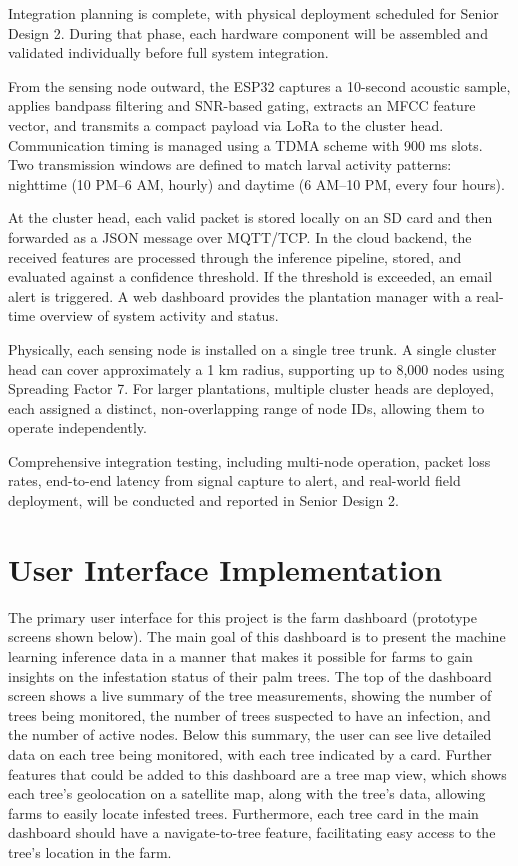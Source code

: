 \documentclass[12pt,a4paper,oneside]{memoir}
\begin{document}
Integration planning is complete, with physical deployment scheduled for Senior Design 2. During that phase, each hardware component will be assembled and validated individually before full system integration.

From the sensing node outward, the ESP32 captures a 10-second acoustic sample, applies bandpass filtering and SNR-based gating, extracts an MFCC feature vector, and transmits a compact payload via LoRa to the cluster head. Communication timing is managed using a TDMA scheme with 900 ms slots. Two transmission windows are defined to match larval activity patterns: nighttime (10 PM--6 AM, hourly) and daytime (6 AM--10 PM, every four hours).

At the cluster head, each valid packet is stored locally on an SD card and then forwarded as a JSON message over MQTT/TCP. In the cloud backend, the received features are processed through the inference pipeline, stored, and evaluated against a confidence threshold. If the threshold is exceeded, an email alert is triggered. A web dashboard provides the plantation manager with a real-time overview of system activity and status.

Physically, each sensing node is installed on a single tree trunk. A single cluster head can cover approximately a 1 km radius, supporting up to 8,000 nodes using Spreading Factor 7. For larger plantations, multiple cluster heads are deployed, each assigned a distinct, non-overlapping range of node IDs, allowing them to operate independently.

Comprehensive integration testing, including multi-node operation, packet loss rates, end-to-end latency from signal capture to alert, and real-world field deployment, will be conducted and reported in Senior Design 2.

\section{User Interface Implementation}
\label{sec:UIImplementation}

The primary user interface for this project is the farm dashboard (prototype screens shown below). The main goal of this dashboard is to present the machine learning inference data in a manner that makes it possible for farms to gain insights on the infestation status of their palm trees. The top of the dashboard screen shows a live summary of the tree measurements, showing the number of trees being monitored, the number of trees suspected to have an infection, and the number of active nodes. Below this summary, the user can see live detailed data on each tree being monitored, with each tree indicated by a card. Further features that could be added to this dashboard are a tree map view, which shows each tree's geolocation on a satellite map, along with the tree's data, allowing farms to easily locate infested trees. Furthermore, each tree card in the main dashboard should have a navigate-to-tree feature, facilitating easy access to the tree's location in the farm.
\end{document}
